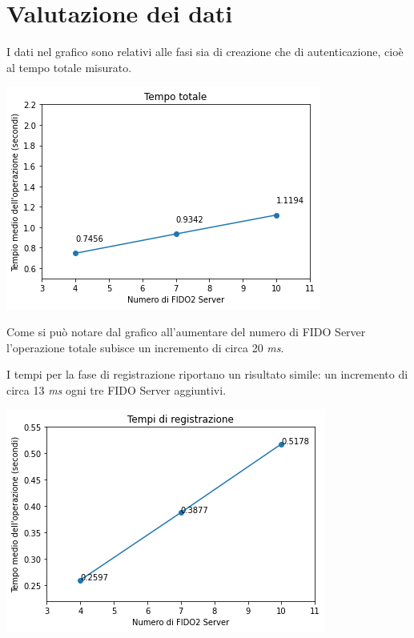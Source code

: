 \section{Valutazione dei dati}
\label{valutazione}

I dati nel grafico sono relativi alle fasi sia di creazione che di autenticazione, cioè al tempo totale misurato.
\begin{center}
	\includegraphics[scale=0.65]{figures/test_results}
\end{center}

Come si può notare dal grafico all'aumentare del numero di FIDO Server l'operazione totale subisce un incremento di circa 20 \emph{ms}. 

I tempi per la fase di registrazione riportano un risultato simile: un incremento di circa 13 \emph{ms} ogni tre FIDO Server aggiuntivi.
\begin{center}
	\includegraphics[scale=0.65]{figures/creation_results}
\end{center}

